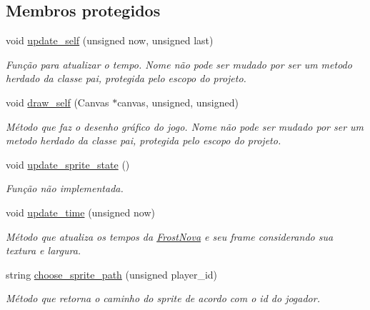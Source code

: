 \subsection*{Membros protegidos}
\begin{DoxyCompactItemize}
\item 
void \mbox{\hyperlink{classFrostNova_a67b11608de8a77e5db5820f422f66e79}{update\+\_\+self}} (unsigned now, unsigned last)
\begin{DoxyCompactList}\small\item\em Função para atualizar o tempo. Nome não pode ser mudado por ser um metodo herdado da classe pai, protegida pelo escopo do projeto. \end{DoxyCompactList}\item 
void \mbox{\hyperlink{classFrostNova_a0300555461a04885ec1596d60a5a82b7}{draw\+\_\+self}} (Canvas $\ast$canvas, unsigned, unsigned)
\begin{DoxyCompactList}\small\item\em Método que faz o desenho gráfico do jogo. Nome não pode ser mudado por ser um metodo herdado da classe pai, protegida pelo escopo do projeto. \end{DoxyCompactList}\item 
void \mbox{\hyperlink{classFrostNova_a94a2cd8221910ffa0abe0930ca9d5934}{update\+\_\+sprite\+\_\+state}} ()
\begin{DoxyCompactList}\small\item\em Função não implementada. \end{DoxyCompactList}\item 
void \mbox{\hyperlink{classFrostNova_ab70b5520c6db428c77aef44fe8e85570}{update\+\_\+time}} (unsigned now)
\begin{DoxyCompactList}\small\item\em Método que atualiza os tempos da \mbox{\hyperlink{classFrostNova}{Frost\+Nova}} e seu frame considerando sua textura e largura. \end{DoxyCompactList}\item 
string \mbox{\hyperlink{classFrostNova_afc420630fdfd93b865ea086b0e0c55ba}{choose\+\_\+sprite\+\_\+path}} (unsigned player\+\_\+id)
\begin{DoxyCompactList}\small\item\em Método que retorna o caminho do sprite de acordo com o id do jogador. \end{DoxyCompactList}\end{DoxyCompactItemize}
